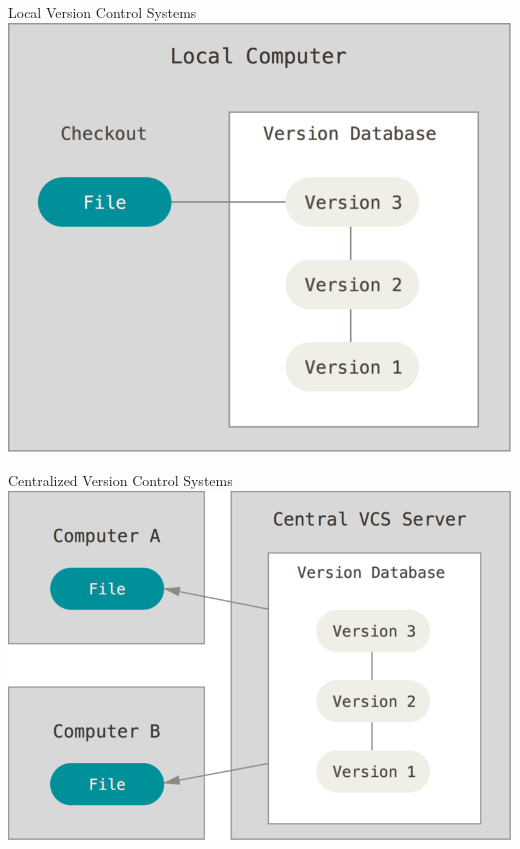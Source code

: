\documentclass[10pt, compress]{beamer}
\begin{document}
\begin{frame}{Local Version Control Systems}
	\includegraphics[width=\textwidth*8/10]{images/local}
\end{frame}

\begin{frame}{Centralized Version Control Systems}
	\includegraphics[width=\textwidth*8/10]{images/centralized}
\end{frame}
\end{document}
